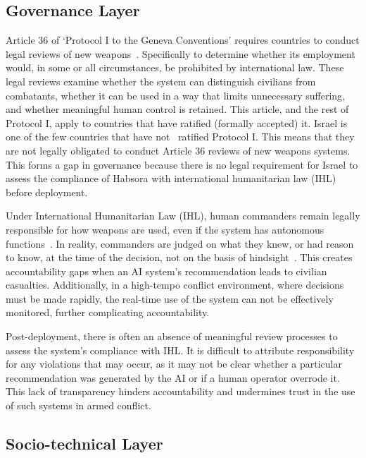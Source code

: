 \subsection{Governance Layer}

Article 36 of `Protocol I to the Geneva Conventions' requires countries to conduct legal reviews of new weapons~\citet{icrc_api_article36_1977}. Specifically to determine whether its employment would, in some or all circumstances, be prohibited by international law. These legal reviews examine whether the system can distinguish civilians from combatants, whether it can be used in a way that limits unnecessary suffering, and whether meaningful human control is retained. This article, and the rest of Protocol I, apply to countries that have ratified (formally accepted) it. Israel is one of the few countries that have not~\citep{icrc_api_stateparties} ratified Protocol I. This means that they are not legally obligated to conduct Article 36 reviews of new weapons systems. This forms a gap in governance because there is no legal requirement for Israel to assess the compliance of Habsora with international humanitarian law (IHL) before deployment.


Under International Humanitarian Law (IHL), human commanders remain legally responsible for how weapons are used, even if the system has autonomous functions~\citep{icrc_api_article86_1977}. In reality, commanders are judged on what they knew, or had reason to know, at the time of the decision, not on the basis of hindsight~\citep{henckaerts2005customary}. This creates accountability gaps when an AI system's recommendation leads to civilian casualties. Additionally, in a high-tempo conflict environment, where decisions must be made rapidly, the real-time use of the system can not be effectively monitored, further complicating accountability.

Post-deployment, there is often an absence of meaningful review processes to assess the system's compliance with IHL. It is difficult to attribute responsibility for any violations that may occur, as it may not be clear whether a particular recommendation was generated by the AI or if a human operator overrode it. This lack of transparency hinders accountability and undermines trust in the use of such systems in armed conflict.



\subsection{Socio-technical Layer}

